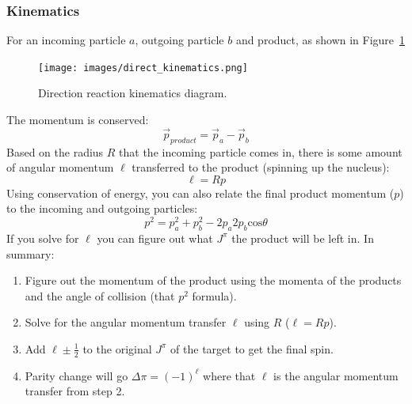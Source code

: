 \documentclass[letter]{article}
\begin{document}
\subsubsection{Kinematics}
For an incoming particle $a$, outgoing particle $b$ and product,
  as shown in Figure~\ref{fig:direct_kinematics}
  \begin{figure}[hbtp]
    \centering
    \texttt{[image: images/direct\_kinematics.png]}
    \caption{Direction reaction kinematics diagram.\label{fig:direct_kinematics}}
  \end{figure}
The momentum is conserved:
\begin{equation*}
  \vec{p}_{product}=\vec{p}_a-\vec{p}_b
\end{equation*}
Based on the radius $R$ that the incoming particle comes in, there is
some amount of angular momentum $\ell$ transferred to the product
(spinning up the nucleus):
\begin{equation*}
  \ell=Rp
\end{equation*}
Using conservation of energy, you can also relate the final product
momentum ($p$) to the incoming and outgoing particles:
\begin{equation*}
  p^2=p^2_a+p^2_b-2p_a2p_b\text{cos}\theta
\end{equation*}
If you solve for $\ell$ you can figure out what $J^{\pi}$ the product
will be left in. In summary:
\begin{enumerate}
\item Figure out the momentum of the product using the momenta of the
  products and the angle of collision (that $p^2$ formula).
\item Solve for the angular momentum transfer $\ell$ using $R$ ($\ell=Rp$).
\item Add $\ell\pm\frac{1}{2}$ to the original $J^\pi$ of the target to
  get the final spin.
\item Parity change will go $\Delta\pi = (-1)^\ell$ where that $\ell$ is the
  angular momentum transfer from step 2.
\end{enumerate}
\cite[Lec 25]{lecture}
\end{document}
